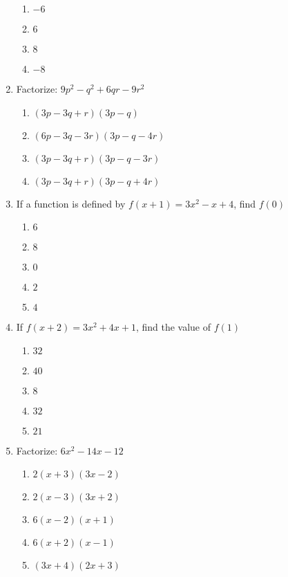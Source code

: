 \begin{multicols}{2}
\begin{enumerate}[label={\arabic*.}]
      \begin{enumerate}[label={\Alph*.}]
        \item \(-6\)
        \item \(6\)
        \item \(8\)
        \item \(-8\)
      \end{enumerate}
    \item Factorize: \(9p^2-q^2+6qr-9r^2\)
      \begin{enumerate}[label={\Alph*.}]
        \item \((3p-3q+r)(3p-q)\)
        \item \((6p-3q-3r)(3p-q-4r)\)
        \item \((3p-3q+r)(3p-q-3r)\)
        \item \((3p-3q+r)(3p-q+4r)\)
      \end{enumerate}
    \item If a function is defined by \(f(x+1) = 3x^2-x+4\), find \(f(0)\)
      \begin{enumerate}[label={\Alph*.}]
        \item \(6\)
        \item \(8\)
        \item \(0\)
        \item \(2\)
        \item \(4\)
      \end{enumerate}
    \item If \(f(x+2) = 3x^2 + 4x + 1\), find the value of \(f(1)\)
      \begin{enumerate}[label={\Alph*.}]
        \item \(32\)
        \item \(40\)
        \item \(8\)
        \item \(32\)
        \item \(21\)
      \end{enumerate}
    \item Factorize: \(6x^2 - 14x - 12\)
      \begin{enumerate}[label={\Alph*.}]
        \item \(2(x+3)(3x-2)\)
        \item \(2(x-3)(3x +2)\)
        \item \(6(x-2)(x+1)\)
        \item \(6(x+2)(x-1)\)
        \item \((3x+4)(2x+3)\)
      \end{enumerate}

\end{enumerate}
\end{multicols}
